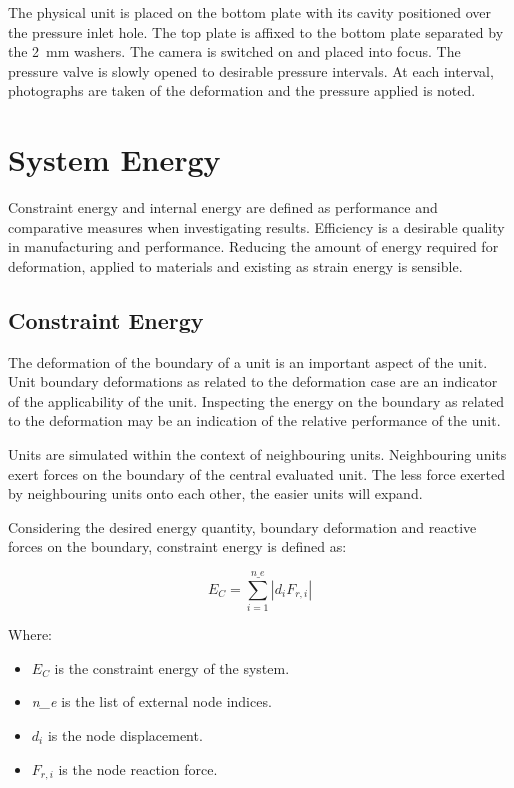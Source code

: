 The physical unit is placed on the bottom plate with its cavity positioned over the pressure inlet hole. The top plate is affixed to the bottom plate separated by the \SI{2}{mm} washers. The camera is switched on and placed into focus. The pressure valve is slowly opened to desirable pressure intervals. At each interval, photographs are taken of the deformation and the pressure applied is noted.

\section{System Energy}
\label{sec:SE}

Constraint energy and internal energy are defined as performance and comparative measures when investigating results. Efficiency is a desirable quality in manufacturing and performance. Reducing the amount of energy required for deformation, applied to materials and existing as strain energy is sensible.

\subsection{Constraint Energy}

The deformation of the boundary of a unit is an important aspect of the unit. Unit boundary deformations as related to the deformation case are an indicator of the applicability of the unit. Inspecting the energy on the boundary as related to the deformation may be an indication of the relative performance of the unit.

Units are simulated within the context of neighbouring units. Neighbouring units exert forces on the boundary of the central evaluated unit. The less force exerted by neighbouring units onto each other, the easier units will expand.

Considering the desired energy quantity, boundary deformation and reactive forces on the boundary, constraint energy is defined as:

\begin{equation}
	E_{C}=\sum_{i=1}^{n\_e}\left | d_{i}F_{r,i} \right |
\end{equation}

Where:

\begin{itemize}
	\item $E_{C}$ is the constraint energy of the system.
	\item \textit{n\_e} is the list of external node indices.
	\item $d_{i}$ is the node displacement.
	\item $F_{r,i}$ is the node reaction force.
\end{itemize}

